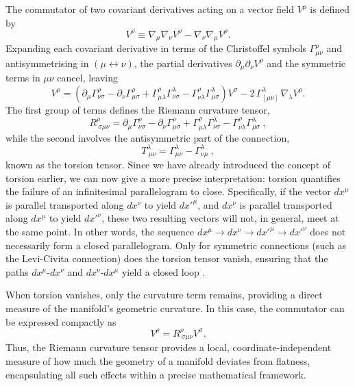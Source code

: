 The commutator of two covariant derivatives acting on a vector field $V^\rho$ is defined by
\begin{equation}
[\nabla_\mu, \nabla_\nu] V^\rho \equiv \nabla_\mu \nabla_\nu V^\rho - \nabla_\nu \nabla_\mu V^\rho.
\end{equation}
Expanding each covariant derivative in terms of the Christoffel symbols $\Gamma^\rho_{\mu\nu}$ and antisymmetrising in $(\mu \leftrightarrow \nu)$, the partial derivatives $\partial_\mu \partial_\nu V^\rho$ and the symmetric terms in $\mu\nu$ cancel, leaving
\begin{equation}
[\nabla_\mu, \nabla_\nu] V^\rho 
= \left( \partial_\mu \Gamma^\rho_{\nu\sigma} - \partial_\nu \Gamma^\rho_{\mu\sigma} 
+ \Gamma^\rho_{\mu\lambda} \Gamma^\lambda_{\nu\sigma} 
- \Gamma^\rho_{\nu\lambda} \Gamma^\lambda_{\mu\sigma} \right) V^\sigma
- 2\,\Gamma^\lambda_{[\mu\nu]} \, \nabla_\lambda V^\rho.
\end{equation}
The first group of terms defines the Riemann curvature tensor,
\begin{equation}
R^\rho_{\ \sigma\mu\nu} = \partial_\mu \Gamma^\rho_{\nu\sigma} - \partial_\nu \Gamma^\rho_{\mu\sigma} 
+ \Gamma^\rho_{\mu\lambda} \Gamma^\lambda_{\nu\sigma} 
- \Gamma^\rho_{\nu\lambda} \Gamma^\lambda_{\mu\sigma} \ ,
\label{riemanntensoreq}
\end{equation}
while the second involves the antisymmetric part of the connection,
\begin{equation}
T^\lambda_{\ \mu\nu} = \Gamma^\lambda_{\mu\nu} - \Gamma^\lambda_{\nu\mu} \ ,
\end{equation}
known as the torsion tensor. Since we have already introduced the concept of torsion earlier, we can now give a more precise interpretation: torsion quantifies the failure of an infinitesimal parallelogram to close. Specifically, if the vector $dx^\mu$ is parallel transported along $dx^\nu$ to yield $dx'^\mu$, and $dx^\nu$ is parallel transported along $dx^\mu$ to yield $dx'^\nu$, these two resulting vectors will not, in general, meet at the same point. In other words, the sequence $dx^\mu \rightarrow dx^\nu \rightarrow dx'^\mu \rightarrow dx'^\nu$ does not necessarily form a closed parallelogram. Only for symmetric connections (such as the Levi-Civita connection) does the torsion tensor vanish, ensuring that the paths $dx^\mu$-$dx^\nu$ and $dx^\nu$-$dx^\mu$ yield a closed loop \cite{LlibreBertJanssen}.

When torsion vanishes, only the curvature term remains, providing a direct measure of the manifold's geometric curvature. In this case, the commutator can be expressed compactly as
\begin{equation}
[\nabla_\mu, \nabla_\nu] V^\rho 
= R^\rho_{\ \sigma\mu\nu} V^\sigma.
\end{equation}
Thus, the Riemann curvature tensor provides a local, coordinate-independent measure of how much the geometry of a manifold deviates from flatness, encapsulating all such effects within a precise mathematical framework.



